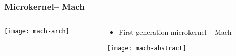 \begin{frame}[plain]
	\frametitle{Microkernel-- Mach}
	
	
	\begin{columns}
		
		\begin{column}{.4\textwidth}
			\centering
			\texttt{[image: mach-arch]}
		\end{column}
		
		\begin{column}{.6\textwidth}
			
			\begin{itemize}
				\item First generation microkernel -- Mach 
				
			\end{itemize}	
			\texttt{[image: mach-abstract]}	
		\end{column}
		
		
	\end{columns}
	
\end{frame}


